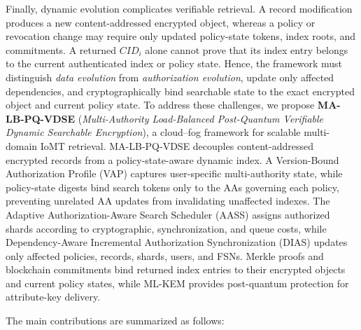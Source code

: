 \documentclass{ieeetj}
\theoremstyle{ieee-style}
\begin{document}
Finally, dynamic evolution complicates verifiable retrieval. A record
modification produces a new content-addressed encrypted object, whereas a
policy or revocation change may require only updated policy-state tokens,
index roots, and commitments. A returned $CID_i$ alone cannot prove that
its index entry belongs to the current authenticated index or policy
state. Hence, the framework must distinguish \emph{data evolution} from
\emph{authorization evolution}, update only affected dependencies, and
cryptographically bind searchable state to the exact encrypted object and
current policy state.
To address these challenges, we propose
\textbf{MA-LB-PQ-VDSE}
(\emph{Multi-Authority Load-Balanced Post-Quantum Verifiable Dynamic
Searchable Encryption}), a cloud--fog framework for scalable multi-domain
IoMT retrieval. MA-LB-PQ-VDSE decouples content-addressed encrypted
records from a policy-state-aware dynamic index. A Version-Bound
Authorization Profile (VAP) captures user-specific multi-authority state,
while policy-state digests bind search tokens only to the AAs governing
each policy, preventing unrelated AA updates from invalidating unaffected
indexes. The Adaptive Authorization-Aware Search Scheduler (AASS) assigns
authorized shards according to cryptographic, synchronization, and queue
costs, while Dependency-Aware Incremental Authorization Synchronization
(DIAS) updates only affected policies, records, shards, users, and FSNs.
Merkle proofs and blockchain commitments bind returned index entries to
their encrypted objects and current policy states, while ML-KEM provides
post-quantum protection for attribute-key delivery.

The main contributions are summarized as follows:
\end{document}
